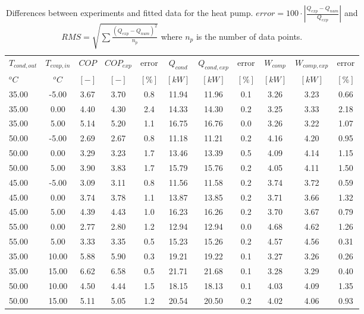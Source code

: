 \documentclass[english]{SPFShortReport}
\begin{document}
\begin{table}[!ht]
\begin{small}
\caption{Differences between experiments and fitted data for the heat pump.          $error=100 \cdot |\frac{Q_{exp}-Q_{num}}{Q_{exp}}|$ and $RMS = \sqrt { \sum{\frac{(Q_{exp}-Q_{num})^2}{n_p}} }$ where $n_p$ is the number of data points.}
\begin{center}
\resizebox{12cm}{!} 
{
\begin{tabular}{l | c c c c c c c c c c } 
\hline
\hline
$T_{cond,out}$ &$T_{evap,in}$ &$COP$ &$COP_{exp}$ &error &$Q_{cond}$ &$Q_{cond,exp}$ &error &$W_{comp}$ &$W_{comp,exp}$ &error \\ 
$^oC$ &$^oC$ &$[-]$ &$[-]$ &$[\%]$ &$[kW]$ &$[kW]$ &$[\%]$ &$[kW]$ &$[kW]$ &$[\%]$\\ 
\hline
35.00  & -5.00 & 3.67 & 3.70 & 0.8 & 11.94 & 11.96 & 0.1 & 3.26 & 3.23 & 0.66\\ 
35.00  & 0.00 & 4.40 & 4.30 & 2.4 & 14.33 & 14.30 & 0.2 & 3.25 & 3.33 & 2.18\\ 
35.00  & 5.00 & 5.14 & 5.20 & 1.1 & 16.75 & 16.76 & 0.0 & 3.26 & 3.22 & 1.07\\ 
50.00  & -5.00 & 2.69 & 2.67 & 0.8 & 11.18 & 11.21 & 0.2 & 4.16 & 4.20 & 0.95\\ 
50.00  & 0.00 & 3.29 & 3.23 & 1.7 & 13.46 & 13.39 & 0.5 & 4.09 & 4.14 & 1.15\\ 
50.00  & 5.00 & 3.90 & 3.83 & 1.7 & 15.79 & 15.76 & 0.2 & 4.05 & 4.11 & 1.50\\ 
45.00  & -5.00 & 3.09 & 3.11 & 0.8 & 11.56 & 11.58 & 0.2 & 3.74 & 3.72 & 0.59\\ 
45.00  & 0.00 & 3.74 & 3.78 & 1.1 & 13.87 & 13.85 & 0.2 & 3.71 & 3.66 & 1.32\\ 
45.00  & 5.00 & 4.39 & 4.43 & 1.0 & 16.23 & 16.26 & 0.2 & 3.70 & 3.67 & 0.79\\ 
55.00  & 0.00 & 2.77 & 2.80 & 1.2 & 12.94 & 12.94 & 0.0 & 4.68 & 4.62 & 1.26\\ 
55.00  & 5.00 & 3.33 & 3.35 & 0.5 & 15.23 & 15.26 & 0.2 & 4.57 & 4.56 & 0.31\\ 
35.00  & 10.00 & 5.88 & 5.90 & 0.3 & 19.21 & 19.22 & 0.1 & 3.27 & 3.26 & 0.26\\ 
35.00  & 15.00 & 6.62 & 6.58 & 0.5 & 21.71 & 21.68 & 0.1 & 3.28 & 3.29 & 0.40\\ 
50.00  & 10.00 & 4.50 & 4.44 & 1.5 & 18.15 & 18.13 & 0.1 & 4.03 & 4.09 & 1.35\\ 
50.00  & 15.00 & 5.11 & 5.05 & 1.2 & 20.54 & 20.50 & 0.2 & 4.02 & 4.06 & 0.93\\ 

\end{tabular}}
\end{center}
\end{small}
\end{table}
\end{document}
